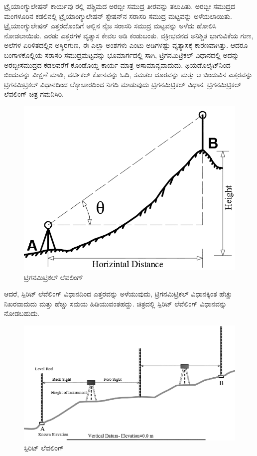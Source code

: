 ಟ್ರೈಯಾಂಗ್ಯುಲೇಷನ್​ ಕಾರ್ಯವು  ರಲ್ಲಿ ಪಶ್ಚಿಮದ ಅರಬ್ಬೀ ಸಮುದ್ರ ತೀರವನ್ನು ತಲುಪಿತು. ಅರಬ್ಬೀ ಸಮುದ್ರದ ಮಂಗಳೂರಿನ ಕಡಲಿನಲ್ಲಿ ಟ್ರೈಯಾಂಗ್ಯುಲೇಷನ್​ ಸ್ಟೇಷನ್​ನ ಸರಾಸರಿ ಸಮುದ್ರ ಮಟ್ಟವನ್ನು ಅಳೆಯಲಾಯಿತು. ಟ್ರೈಯಾಂಗ್ಯುಲೇಷನ್​ ಎತ್ತರದೊಂದಿಗೆ ಅಲ್ಲಿನ ನೈಜ ಸರಾಸರಿ ಸಮುದ್ರ ಮಟ್ಟವನ್ನು ಅಳೆದು ಹೋಲಿಸಿ ನೋಡಲಾಯಿತು. ಎರಡು ಎತ್ತರಗಳ ವ್ಯತ್ಯಾಸ ಕೇವಲ  ಅಡಿ ಕಂಡುಬಂತು. ವಕ್ರೀಭವನದ ಅನಿಶ್ಚಿತ ಭಾಗುವಿಕೆಯ ಗುಣ, ಅಲೆಗಳ ಏರಿಳಿತದಲ್ಲಿನ ಅಸ್ಥಿರಗುಣ, ಈ ಎಲ್ಲಾ ಅಂಶಗಳು ಎಂಟು ಅಡಿಗಳಷ್ಟು ವ್ಯತ್ಯಾಸಕ್ಕೆ ಕಾರಣವಾಗಿತ್ತು. ಆದರೂ ಬಂಗಾಳಕೊಲ್ಲಿಯ ಸರಾಸರಿ ಸಮುದ್ರಮಟ್ಟವನ್ನು ಭೂಮಾರ್ಗದಲ್ಲಿ ಸಾಗಿ, ಟ್ರಿಗನಮಿಟ್ರಿಕಲ್​ ವಿಧಾನದಲ್ಲಿ ಅದನ್ನು ಅರಬ್ಬೀಸಮುದ್ರದ ಕಡಲವರೆಗೆ ಕೊಂಡೊಯ್ದ ಕಾರ್ಯ ಮಾತ್ರ ಅಸಾಮಾನ್ಯವಾದುದು. ಥಿಯಡೊಲೈಟ್​ನಿಂದ ಬಿಂದುವನ್ನು ವೀಕ್ಷಣೆ ಮಾಡಿ, ವರ್ಟಿಕಲ್​ ಕೋನವನ್ನು ಓದಿ, ಸಮತಲ ದೂರವನ್ನು ಮತ್ತು ಆ ಬಿಂದುವಿನ ಎತ್ತರವನ್ನು ಟ್ರಿಗನಮಿಟ್ರಿಕಲ್​ ವಿಧಾನದಿಂದ ಲೆಕ್ಕಾಚಾರದಿಂದ ನಿಗದಿ ಮಾಡುವುದು ಟ್ರಿಗನಮಿಟ್ರಿಕಲ್​ ವಿಧಾನ. ಟ್ರಿಗನಮಿಟ್ರಿಕಲ್​ ಲೆವಲಿಂಗ್​ ಚಿತ್ರ ಗಮನಿಸಿರಿ.

\begin{figure}[!htbp]
\includegraphics{"images/image010.jpg"}
\caption{ಟ್ರಿಗನಮಿಟ್ರಿಕಲ್​ ಲೆವಲಿಂಗ್}\label{chap6-fig1}
\end{figure}

ಆದರೆ, ಸ್ಪಿರಿಟ್​ ಲೆವೆಲಿಂಗ್​ ವಿಧಾನದಿಂದ ಎತ್ತರವನ್ನು ಅಳೆಯುವುದು, ಟ್ರಿಗನಮಿಟ್ರಿಕಲ್​ ವಿಧಾನಕ್ಕಿಂತ ಹೆಚ್ಚು ನಿಖರವಾದುದು ಮತ್ತು ಹೆಚ್ಚು ಸಮಯ ಹಿಡಿಯುವಂತಹದ್ದು. ಚಿತ್ರದಲ್ಲಿ ಸ್ಪಿರಿಟ್​ ಲೆವೆಲಿಂಗ್​ ವಿಧಾನವನ್ನು ನೋಡಬಹುದು.

\begin{figure}[!htbp]
\includegraphics{"images/image011.jpg"}
\caption{ಸ್ಪಿರಿಟ್ ಲೆವಲಿಂಗ್}\label{chap6-fig2}
\end{figure}

